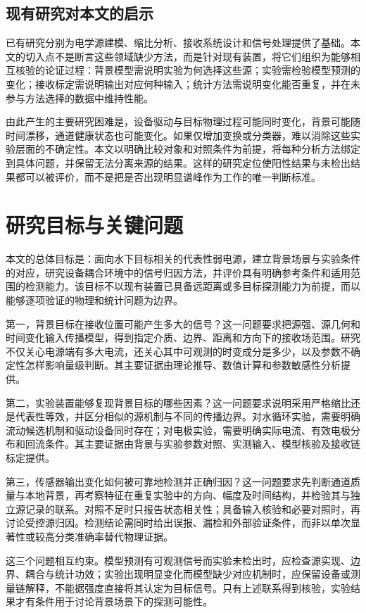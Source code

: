 \subsection{现有研究对本文的启示}

已有研究分别为电学源建模、缩比分析、接收系统设计和信号处理提供了基础。本文的切入点不是断言这些领域缺少方法，而是针对现有装置，将它们组织为能够相互核验的论证过程：背景模型需说明实验为何选择这些源；实验需检验模型预测的变化；接收标定需说明输出对应何种输入；统计方法需说明变化能否重复，并在未参与方法选择的数据中维持性能。

由此产生的主要研究困难是，设备驱动与目标物理过程可能同时变化，背景可能随时间漂移，通道健康状态也可能变化。如果仅增加变换或分类器，难以消除这些实验层面的不确定性。本文以明确比较对象和对照条件为前提，将每种分析方法绑定到具体问题，并保留无法分离来源的结果。这样的研究定位使阳性结果与未检出结果都可以被评价，而不是把是否出现明显谱峰作为工作的唯一判断标准。

\section{研究目标与关键问题}

本文的总体目标是：面向水下目标相关的代表性弱电源，建立背景场景与实验条件的对应，研究设备耦合环境中的信号归因方法，并评价具有明确参考条件和适用范围的检测能力。该目标不以现有装置已具备远距离或多目标探测能力为前提，而以能够逐项验证的物理和统计问题为边界。

第一，背景目标在接收位置可能产生多大的信号？这一问题要求把源强、源几何和时间变化输入传播模型，得到指定介质、边界、距离和方向下的接收场范围。研究不仅关心电源端有多大电流，还关心其中可观测的时变成分是多少，以及参数不确定性怎样影响量级判断。其主要证据由理论推导、数值计算和参数敏感性分析提供。

第二，实验装置能够复现背景目标的哪些因素？这一问题要求说明采用严格缩比还是代表性等效，并区分相似的源机制与不同的传播边界。对水循环实验，需要明确流动候选机制和驱动设备同时存在；对电极实验，需要明确实际电流、有效电极分布和回流条件。其主要证据由背景与实验参数对照、实测输入、模型核验及接收链标定提供。

第三，传感器输出变化如何被可靠地检测并正确归因？这一问题要求先判断通道质量与本地背景，再考察特征在重复实验中的方向、幅度及时间结构，并检验其与独立源记录的联系。对照不足时只报告状态相关性；具备输入核验和必要对照时，再讨论受控源归因。检测结论需同时给出误报、漏检和外部验证条件，而非以单次显著性或较高分类准确率替代物理证据。

这三个问题相互约束。模型预测有可观测信号而实验未检出时，应检查源实现、边界、耦合与统计功效；实验出现明显变化而模型缺少对应机制时，应保留设备或测量链解释，不能据强度直接将其认定为目标信号。只有上述联系得到核验，实验结果才有条件用于讨论背景场景下的探测可能性。

